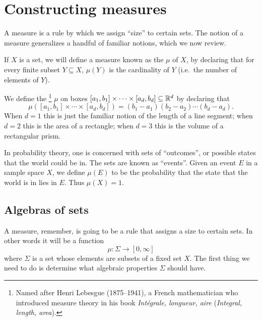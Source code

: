 \chapter{Constructing measures}\label{ch:ch1}\label{measureChapter}
A measure is a rule by which we assign ``size'' to certain sets.
The notion of a measure generalizes a handful of familiar notions, which we now review.
\begin{example}\label{examples of measures}
If $X$ is a set, we will define a measure known as the  $\mu$ of $X$, by declaring that for every finite subset $Y \subseteq X$, $\mu(Y)$ is the cardinality of $Y$ (i.e.\ the number of elements of $Y$).

We define the \footnote{Named after Henri Lebesgue (1875--1941), a French mathematician who introduced measure theory in his book \emph{Intégrale, longueur, aire} (\emph{Integral, length, area}).}
$\mu$ on boxes $[a_{1}, b_{1}] \times \cdots \times [a_{d}, b_{d}] \subseteq \mathbb{R}^{d}$ by declaring that
\[\mu([a_{1}, b_{1}] \times \cdots \times [a_{d}, b_{d}]) = (b_{1} - a_{1})(b_{2} - a_{2})\cdots(b_{d} - a_{d}).\]
When $d = 1$ this is just the familiar notion of the length of a line segment; when $d = 2$ this is the area of a rectangle; when $d = 3$ this is the volume of a rectangular prism.

In probability theory, one is concerned with sets of ``outcomes'', or possible states that the world could be in.
The sets are known as ``events''.
Given an event $E$ in a sample space $X$, we define $\mu(E)$ to be the probability that the state that the world is in lies in $E$. Thus $\mu(X) = 1$.
\end{example}

\section{Algebras of sets}
A measure, remember, is going to be a rule that assigns a size to certain sets.
In other words it will be a function
$$\mu: \Sigma \to [0, \infty]$$
where $\Sigma$ is a set whose elements are subsets of a fixed set $X$.
The first thing we need to do is determine what algebraic properties $\Sigma$ should have.

